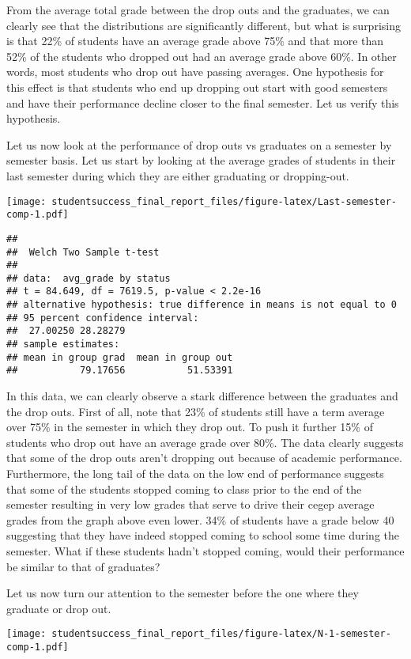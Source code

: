 \documentclass[]{book}
\theoremstyle{definition}
\theoremstyle{definition}
\theoremstyle{remark}
\begin{document}
From the average total grade between the drop outs and the graduates, we
can clearly see that the distributions are significantly different, but
what is surprising is that 22\% of students have an average grade above
75\% and that more than 52\% of the students who dropped out had an
average grade above 60\%. In other words, most students who drop out
have passing averages. One hypothesis for this effect is that students
who end up dropping out start with good semesters and have their
performance decline closer to the final semester. Let us verify this
hypothesis.

Let us now look at the performance of drop outs vs graduates on a
semester by semester basis. Let us start by looking at the average
grades of students in their last semester during which they are either
graduating or dropping-out.

\texttt{[image: studentsuccess\_final\_report\_files/figure-latex/Last-semester-comp-1.pdf]}

\begin{verbatim}
## 
##  Welch Two Sample t-test
## 
## data:  avg_grade by status
## t = 84.649, df = 7619.5, p-value < 2.2e-16
## alternative hypothesis: true difference in means is not equal to 0
## 95 percent confidence interval:
##  27.00250 28.28279
## sample estimates:
## mean in group grad  mean in group out 
##           79.17656           51.53391
\end{verbatim}

In this data, we can clearly observe a stark difference between the
graduates and the drop outs. First of all, note that 23\% of students
still have a term average over 75\% in the semester in which they drop
out. To push it further 15\% of students who drop out have an average
grade over 80\%. The data clearly suggests that some of the drop outs
aren't dropping out because of academic performance. Furthermore, the
long tail of the data on the low end of performance suggests that some
of the students stopped coming to class prior to the end of the semester
resulting in very low grades that serve to drive their cegep average
grades from the graph above even lower. 34\% of students have a grade
below 40 suggesting that they have indeed stopped coming to school some
time during the semester. What if these students hadn't stopped coming,
would their performance be similar to that of graduates?

Let us now turn our attention to the semester before the one where they
graduate or drop out.

\texttt{[image: studentsuccess\_final\_report\_files/figure-latex/N-1-semester-comp-1.pdf]}
\end{document}
